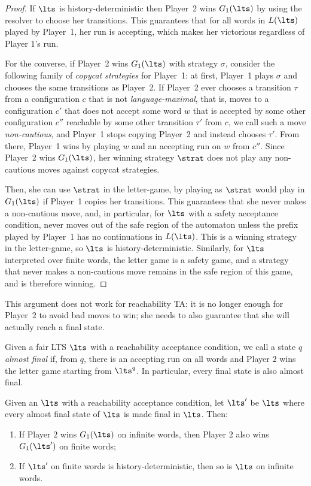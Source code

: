    
\begin{proof}
If $\lts$ is history-deterministic then Player~2 wins $G_1(\lts)$ by using the resolver to choose her transitions. This guarantees that for all words in $L(\lts)$ played by Player~1, her run is accepting, which makes her victorious regardless of Player 1's run.


For the converse, if Player~2 wins $G_1(\lts)$ with strategy $\sigma$, consider the following family of \textit{copycat strategies} for Player~1: at first, Player~1 plays $\sigma$ and chooses the same transitions as Player~2.  If Player~2 ever chooses a transition $\tau$ from a configuration $c$ that is not \emph{language-maximal}, that is, moves to a configuration $c'$ that does not accept some word $w$ that is accepted by some other configuration $c''$ reachable by some other transition $\tau'$ from $c$, we call such a move \emph{non-cautious}, and Player~1 stops copying Player~2 and instead chooses $\tau'$. From there, Player~1 wins by playing $w$ and an accepting run on $w$ from $c''$. Since Player~2 wins $G_1(\lts)$, her winning strategy $\strat$ does not play any non-cautious moves against copycat strategies. 

Then, she can use $\strat$ in the letter-game, by playing as $\strat$ would play in $G_1(\lts)$ if Player~1 copies her transitions. This guarantees that she never makes a non-cautious move, and, in particular, for $\lts$ with a safety acceptance condition, never moves out of the safe region of the automaton unless the prefix played by Player~1 has no continuations in $L(\lts)$. This is a winning strategy in the letter-game, so $\lts$ is history-deterministic.
Similarly, for $\lts$ interpreted over finite words, the letter game is a safety game, and a strategy that never makes a non-cautious move remains in the safe region of this game, and is therefore winning.
\end{proof}
 

This argument does not work for reachability TA: it is no longer enough for Player~2 to avoid bad moves to win; she needs to also guarantee that she will actually reach a final state. 


Given a fair LTS $\lts$ with a reachability acceptance condition, we call a state $q$ \textit{almost final} if, from $q$, there is an accepting run on all words and Player $2$ wins the letter game starting from $\lts^q$. In particular, every final state is also almost final.


\begin{lemma}\label{lem:G1reach}
Given an $\lts$ with a reachability acceptance condition, let $\lts'$ be $\lts$ where every almost final state of $\lts$ is made final in $\lts$. Then:
\begin{enumerate}
\item \label{item:inftofin} If Player $2$ wins $G_1(\lts)$ on infinite words, then Player $2$ also wins $G_1(\lts')$ on finite words;
\item \label{item:fintoinf} If $\lts'$ on finite words is history-deterministic, then so is $\lts$ on infinite words.
\end{enumerate} 
\end{lemma}

